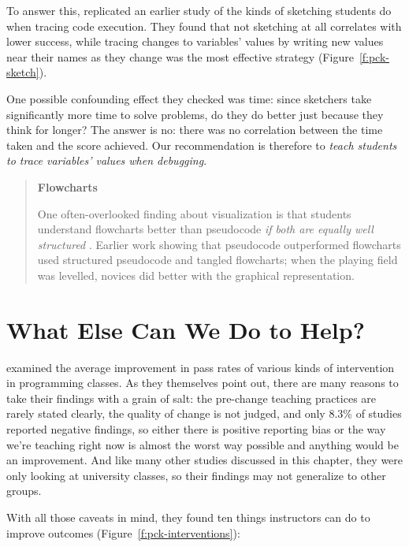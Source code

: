 To answer this, \cite{Cunn2017} replicated an earlier study of the
kinds of sketching students do when tracing code execution. They found
that not sketching at all correlates with lower success, while tracing
changes to variables' values by writing new values near their names as
they change was the most effective strategy (Figure~\ref{f:pck-sketch}).

One possible confounding effect they checked was time: since sketchers
take significantly more time to solve problems, do they do better just
because they think for longer? The answer is no: there was no
correlation between the time taken and the score achieved. Our
recommendation is therefore to \emph{teach students to trace variables'
values when debugging}.

\begin{quote}\setlength{\parindent}{0pt}
\textbf{Flowcharts}

One often-overlooked finding about visualization is that students
understand flowcharts better than pseudocode \emph{if both are equally well
structured} \cite{Scan1989}. Earlier work showing that pseudocode
outperformed flowcharts used structured pseudocode and tangled
flowcharts; when the playing field was levelled, novices did better
with the graphical representation.
\end{quote}

\section{What Else Can We Do to Help?}\label{s:pck-help}

\cite{Viha2014} examined the average improvement in pass rates of
various kinds of intervention in programming classes. As they themselves
point out, there are many reasons to take their findings with a grain of
salt: the pre-change teaching practices are rarely stated clearly, the
quality of change is not judged, and only 8.3\% of studies reported
negative findings, so either there is positive reporting bias or the way
we're teaching right now is almost the worst way possible and anything
would be an improvement. And like many other studies discussed in this
chapter, they were only looking at university classes, so their findings
may not generalize to other groups.

With all those caveats in mind, they found ten things instructors can do
to improve outcomes (Figure~\ref{f:pck-interventions}):

